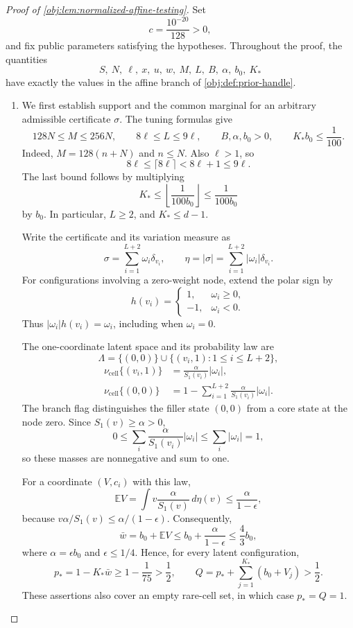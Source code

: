 \begin{proof}[Proof of \cref{obj:lem:normalized-affine-testing}]
Set
\[
c=\frac{10^{-20}}{128}>0,
\]
and fix public parameters satisfying the hypotheses. Throughout the proof, the quantities
\[
S,\ N,\ \ell,\ x,\ u,\ w,\ M,\ L,\ B,\ \alpha,\ b_0,\ K_*
\]
have exactly the values in the affine branch of \cref{obj:def:prior-handle}.

\begin{enumerate}
\item
We first establish support and the common marginal for an arbitrary admissible certificate \(\sigma\). The tuning formulas give
\[
128N\le M\le256N,\qquad
8\ell\le L\le9\ell,\qquad
B,\alpha,b_0>0,\qquad K_*b_0\le\frac1{100}.
\]
Indeed, \(M=128(n+N)\) and \(n\le N\). Also \(\ell>1\), so
\[
8\ell\le\lceil8\ell\rceil<8\ell+1\le9\ell.
\]
The last bound follows by multiplying
\[
K_*\le\left\lfloor\frac1{100b_0}\right\rfloor
\le\frac1{100b_0}
\]
by \(b_0\). In particular, \(L\ge2\), and \(K_*\le d-1\).

Write the certificate and its variation measure as
\[
\sigma=\sum_{i=1}^{L+2}\omega_i\delta_{v_i},
\qquad
\eta=|\sigma|=\sum_{i=1}^{L+2}|\omega_i|\delta_{v_i}.
\]
For configurations involving a zero-weight node, extend the polar sign by
\[
h(v_i)=
\begin{cases}
1,&\omega_i\ge0,\\
-1,&\omega_i<0.
\end{cases}
\]
Thus \(|\omega_i|h(v_i)=\omega_i\), including when \(\omega_i=0\).

The one-coordinate latent space and its probability law are
\[
\Lambda=\{(0,0)\}\cup\{(v_i,1):1\le i\le L+2\},
\]
\[
\begin{aligned}
\nu_{\mathrm{cell}}\{(v_i,1)\}
&=\frac{\alpha}{S_1(v_i)}|\omega_i|,\\
\nu_{\mathrm{cell}}\{(0,0)\}
&=1-\sum_{i=1}^{L+2}\frac{\alpha}{S_1(v_i)}|\omega_i|.
\end{aligned}
\]
The branch flag distinguishes the filler state \((0,0)\) from a core state at the node zero. Since \(S_1(v)\ge\alpha>0\),
\[
0\le\sum_i\frac{\alpha}{S_1(v_i)}|\omega_i|
\le\sum_i|\omega_i|=1,
\]
so these masses are nonnegative and sum to one.

For a coordinate \((V,c_i)\) with this law,
\[
\mathbb EV
=\int v\frac{\alpha}{S_1(v)}\,d\eta(v)
\le\frac{\alpha}{1-\epsilon},
\]
because \(v\alpha/S_1(v)\le\alpha/(1-\epsilon)\). Consequently,
\[
\bar w=b_0+\mathbb EV
\le b_0+\frac{\alpha}{1-\epsilon}
\le\frac43b_0,
\]
where \(\alpha=\epsilon b_0\) and \(\epsilon\le1/4\). Hence, for every latent configuration,
\[
p_*=1-K_*\bar w
\ge1-\frac1{75}>\frac12,
\qquad
Q=p_*+\sum_{j=1}^{K_*}(b_0+V_j)>\frac12.
\]
These assertions also cover an empty rare-cell set, in which case \(p_*=Q=1\).


\end{enumerate}
\end{proof}
